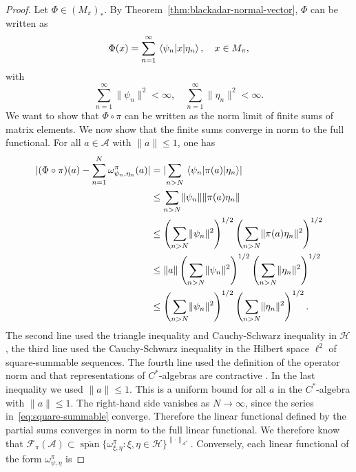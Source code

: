 \documentclass[aps,pra,reprint,superscriptaddress]{revtex4-2}
\newcommand{\cA}{{\mathcal A}}
\newcommand{\cF}{{\mathcal F}}
\newcommand{\cH}{{\mathcal H}}
\renewcommand\P{\Phi}
\providecommand{\abs}[1]{\lvert #1\rvert}
\providecommand{\norm}[1]{\lVert #1\rVert}
\theoremstyle{definition}
\theoremstyle{remark}
\begin{document}
\begin{proof}
Let $\P \in (M_\pi)_*$. By
Theorem~\ref{thm:blackadar-normal-vector}, $\P$ can be written as
\begin{equation}
    \P(x) = \sum_{n=1}^{\infty} \mel{\psi_n}{x}{\eta_n},
    \quad x\in M_\pi,
\end{equation}
with
\begin{equation}
    \sum_{n=1}^{\infty}\norm{\psi_n}^2 < \infty,
    \quad
    \sum_{n=1}^{\infty}\norm{\eta_n}^2 < \infty.\label{eq:square-summable}
\end{equation}
We want to show that $\P \circ \pi$ can be written as the norm limit of finite
sums of matrix elements. We now show that the finite sums converge in norm to the full functional. For all
$a\in\cA$ with $\norm{a}\leq 1$, one has
\begin{align}
    \abs{
        (\P\circ\pi)(a)
        -
        \sum_{n=1}^{N}\omega_{\psi_n,\eta_n}^{\pi}(a)
    } \notag
    &=
    \abs{
        \sum_{n>N}\mel{\psi_n}{\pi(a)}{\eta_n}
    } \notag\\
    & \leq
    \sum_{n>N}\norm{\psi_n}\norm{\pi(a)\eta_n} \notag\\
    & \leq
    \left(\sum_{n>N}\norm{\psi_n}^2\right)^{1/2}
    \left(\sum_{n>N}\norm{\pi(a)\eta_n}^2\right)^{1/2} \notag\\
    & \leq
    \norm{a}
    \left(\sum_{n>N}\norm{\psi_n}^2\right)^{1/2}
    \left(\sum_{n>N}\norm{\eta_n}^2\right)^{1/2} \notag\\
    & \leq
    \left(\sum_{n>N}\norm{\psi_n}^2\right)^{1/2}
    \left(\sum_{n>N}\norm{\eta_n}^2\right)^{1/2}.
\end{align}
The second line used the triangle inequality and Cauchy-Schwarz inequality in $\cH$, the third line
used the Cauchy-Schwarz inequality in the Hilbert space $\ell^2$ of
square-summable sequences. The fourth line used the definition of the operator
norm and that representations of $C^\ast$-algebras are contractive
\cite[II.6.1.2, p.~106]{Blackadar}. In the last inequality we used
$\norm{a}\leq 1$. This is a uniform bound for all
$a$ in the $C^\ast$-algebra with $\norm{a}\leq 1$. The right-hand side vanishes
as $N\rightarrow\infty$, since the series in~\eqref{eq:square-summable} converge. Therefore the linear functional defined by the partial
sums converges in norm to the full linear functional. We 
therefore know that
$\cF_\pi(\cA) \subset \overline{\operatorname{span}}
    \{\omega_{\xi,\eta}^\pi : \xi,\eta \in \cH\}^{\norm{\cdot}_{\cA^*}}$.
Conversely, each linear functional of the form $\omega_{\psi,\eta}^{\pi}$ is

\end{proof}
\end{document}

